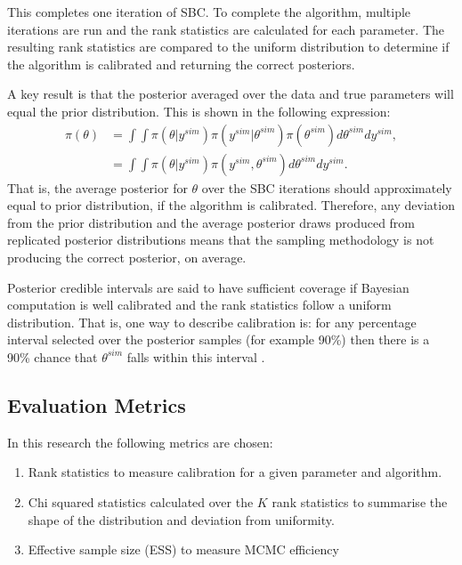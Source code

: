 \documentclass[12pt, a4paper]{article}
\begin{document}
        This completes one iteration of SBC. To complete the algorithm, multiple iterations are run and the rank statistics are calculated for each parameter. The resulting rank statistics are compared to the uniform distribution to determine if the algorithm is calibrated and returning the correct posteriors.

        A key result is that the posterior averaged over the data and true parameters will equal the prior distribution. This is shown in the following expression:
        \begin{align}
        \pi(\theta) &= \int \int \pi(\theta|y^{sim}) \pi(y^{sim}|\theta^{sim}) \pi(\theta^{sim})d\theta^{sim} dy^{sim}, \\
        &= \int \int \pi(\theta|y^{sim}) \pi(y^{sim},\theta^{sim}) d\theta^{sim} dy^{sim}.
        \end{align}
        That is, the average posterior for $\theta$ over the SBC iterations should approximately equal to prior distribution, if the algorithm is calibrated. Therefore, any deviation from the prior distribution and the average posterior draws produced from replicated posterior distributions means that the sampling methodology is not producing the correct posterior, on average.

        Posterior credible intervals are said to have sufficient coverage if Bayesian computation is well calibrated and the rank statistics follow a uniform distribution. That is, one way to describe calibration is: for any percentage interval selected over the posterior samples (for example 90\%) then there is a 90\% chance that $\theta^{sim}$ falls within this interval \citep{dawid1982well}.
        

    \subsection{Evaluation Metrics}
        In this research the following metrics are chosen:

        \begin{enumerate}
            \item Rank statistics to measure calibration for a given parameter and algorithm.
            
            \item Chi squared statistics calculated over the $K$ rank statistics to summarise the shape of the distribution and deviation from uniformity.

            \item Effective sample size (ESS) to measure MCMC efficiency
        \end{enumerate}
\end{document}
